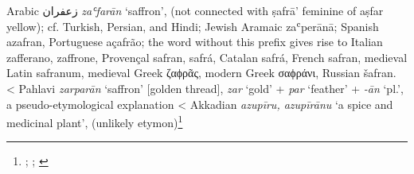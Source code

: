 \begin{etymology}\label{ety:zafaran}
Arabic {زعفران} \textit{zaʿfarān} `saffron', (not connected with ṣafrā' feminine of aṣfar yellow); cf. Turkish, Persian, and Hindi; Jewish Aramaic zaʿperānā; Spanish azafran, Portuguese açafrão; the word without this prefix gives rise to Italian zafferano, zaffrone, Provençal safran, safrá, Catalan safrá, French safran, medieval Latin safranum, medieval Greek ζαϕρᾶς, modern Greek σαϕράνι, Russian šafran. 
< Pahlavi \textit{zarparān} `saffron' [golden thread], \textit{zar} `gold' + \textit{par} `feather' + \textit{-ān} `pl.', a pseudo-etymological explanation
< Akkadian {} \textit{azupīru, azupīrānu} `a spice and medicinal plant', (unlikely etymon)\footnote{\textcite{wehr_dictionary_1976}; \textcites[]{asbaghi_persische_1988}[65, 98]{mackenzie_concise_1986}[safran]{ns}; \textcites[33]{black_concise_2000}[Vol. 2, 530-531]{roth_assyrian_2004}}
\end{etymology}